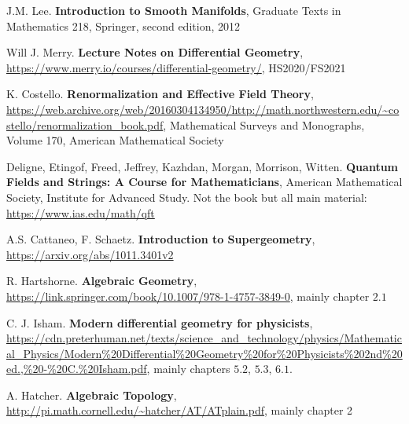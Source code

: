 \begin{thebibliography}{}
	J.M. Lee. \textbf{Introduction to Smooth Manifolds}, Graduate Texts in Mathematics 218, Springer, second edition, 2012\label{Diffgeo_Intro}

	Will J. Merry. \textbf{Lecture Notes on Differential Geometry}, \url{https://www.merry.io/courses/differential-geometry/}, HS2020/FS2021\label{Diffgeo_Merry}

  K. Costello. \textbf{Renormalization and Effective Field Theory}, \url{https://web.archive.org/web/20160304134950/http://math.northwestern.edu/~costello/renormalization_book.pdf}, Mathematical Surveys and Monographs, Volume 170, American Mathematical Society\label{Costello}

  Deligne, Etingof, Freed, Jeffrey, Kazhdan, Morgan, Morrison, Witten. \textbf{Quantum Fields and Strings: A Course for Mathematicians}, American Mathematical Society, Institute for Advanced Study. Not the book but all main material: \url{https://www.ias.edu/math/qft}\label{QFStrings}

  A.S. Cattaneo, F. Schaetz. \textbf{Introduction to Supergeometry}, \url{https://arxiv.org/abs/1011.3401v2}\label{IntroSusy}

  R. Hartshorne. \textbf{Algebraic Geometry}, \url{https://link.springer.com/book/10.1007/978-1-4757-3849-0}, mainly chapter $2.1$\label{AlgebraicGeometry}

  C. J. Isham. \textbf{Modern differential geometry for physicists}, \url{https://cdn.preterhuman.net/texts/science_and_technology/physics/Mathematical_Physics/Modern%20Differential%20Geometry%20for%20Physicists%202nd%20ed.,%20-%20C.%20Isham.pdf}, mainly chapters $5.2$, $5.3$, $6.1$.\label{ModernDiffgeo}

  A. Hatcher. \textbf{Algebraic Topology}, \url{http://pi.math.cornell.edu/~hatcher/AT/ATplain.pdf}, mainly chapter 2\label{AlgebraicTopology}


\end{thebibliography}
